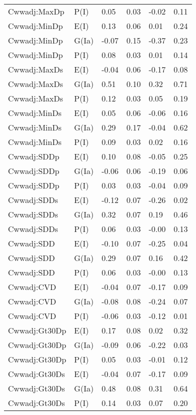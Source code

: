 \begin{center}
\begin{longtable}{|p{1.1in}|p{0.7in}|p{0.7in}|p{0.6in}|p{0.6in}|p{0.6in}|}
  Cwwadj:MaxDp & P(I) & 0.05 & 0.03 & -0.02 & 0.11 \\ 
  Cwwadj:MinDp & E(I) & 0.13 & 0.06 & 0.01 & 0.24 \\ 
  Cwwadj:MinDp & G(Ia) & -0.07 & 0.15 & -0.37 & 0.23 \\ 
  Cwwadj:MinDp & P(I) & 0.08 & 0.03 & 0.01 & 0.14 \\ 
  Cwwadj:MaxDs & E(I) & -0.04 & 0.06 & -0.17 & 0.08 \\ 
  Cwwadj:MaxDs & G(Ia) & 0.51 & 0.10 & 0.32 & 0.71 \\ 
  Cwwadj:MaxDs & P(I) & 0.12 & 0.03 & 0.05 & 0.19 \\ 
  Cwwadj:MinDs & E(I) & 0.05 & 0.06 & -0.06 & 0.16 \\ 
  Cwwadj:MinDs & G(Ia) & 0.29 & 0.17 & -0.04 & 0.62 \\ 
  Cwwadj:MinDs & P(I) & 0.09 & 0.03 & 0.02 & 0.16 \\ 
  Cwwadj:SDDp & E(I) & 0.10 & 0.08 & -0.05 & 0.25 \\ 
  Cwwadj:SDDp & G(Ia) & -0.06 & 0.06 & -0.19 & 0.06 \\ 
  Cwwadj:SDDp & P(I) & 0.03 & 0.03 & -0.04 & 0.09 \\ 
  Cwwadj:SDDs & E(I) & -0.12 & 0.07 & -0.26 & 0.02 \\ 
  Cwwadj:SDDs & G(Ia) & 0.32 & 0.07 & 0.19 & 0.46 \\ 
  Cwwadj:SDDs & P(I) & 0.06 & 0.03 & -0.00 & 0.13 \\ 
  Cwwadj:SDD & E(I) & -0.10 & 0.07 & -0.25 & 0.04 \\ 
  Cwwadj:SDD & G(Ia) & 0.29 & 0.07 & 0.16 & 0.42 \\ 
  Cwwadj:SDD & P(I) & 0.06 & 0.03 & -0.00 & 0.13 \\ 
  Cwwadj:CVD & E(I) & -0.04 & 0.07 & -0.17 & 0.09 \\ 
  Cwwadj:CVD & G(Ia) & -0.08 & 0.08 & -0.24 & 0.07 \\ 
  Cwwadj:CVD & P(I) & -0.06 & 0.03 & -0.12 & 0.01 \\ 
  Cwwadj:Gt30Dp & E(I) & 0.17 & 0.08 & 0.02 & 0.32 \\ 
  Cwwadj:Gt30Dp & G(Ia) & -0.09 & 0.06 & -0.22 & 0.03 \\ 
  Cwwadj:Gt30Dp & P(I) & 0.05 & 0.03 & -0.01 & 0.12 \\ 
  Cwwadj:Gt30Ds & E(I) & -0.04 & 0.07 & -0.17 & 0.09 \\ 
  Cwwadj:Gt30Ds & G(Ia) & 0.48 & 0.08 & 0.31 & 0.64 \\ 
  Cwwadj:Gt30Ds & P(I) & 0.14 & 0.03 & 0.07 & 0.20 \\ 

\end{longtable}
\end{center}
